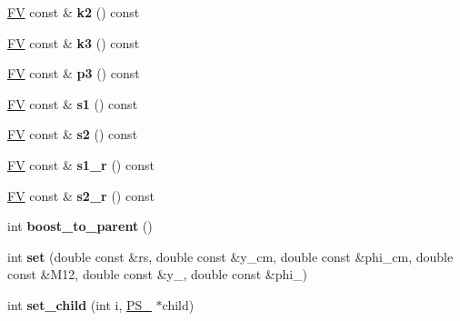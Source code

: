 \begin{DoxyCompactItemize}
\item 
\hypertarget{classPS__2__3_a1135303ac75b75469ceee3de6f1d03de}{\hyperlink{classFV}{F\-V} const \& {\bfseries k2} () const }\label{classPS__2__3_a1135303ac75b75469ceee3de6f1d03de}

\item 
\hypertarget{classPS__2__3_a7fab5e0b464b5bd373cfef36df34c8dd}{\hyperlink{classFV}{F\-V} const \& {\bfseries k3} () const }\label{classPS__2__3_a7fab5e0b464b5bd373cfef36df34c8dd}

\item 
\hypertarget{classPS__2__3_a4264525b624f20abba9726190a9bdaec}{\hyperlink{classFV}{F\-V} const \& {\bfseries p3} () const }\label{classPS__2__3_a4264525b624f20abba9726190a9bdaec}

\item 
\hypertarget{classPS__2__3_a8df409a98b15a028d61fd3066773892b}{\hyperlink{classFV}{F\-V} const \& {\bfseries s1} () const }\label{classPS__2__3_a8df409a98b15a028d61fd3066773892b}

\item 
\hypertarget{classPS__2__3_a447e218eba3647afcf3d24dfef90025f}{\hyperlink{classFV}{F\-V} const \& {\bfseries s2} () const }\label{classPS__2__3_a447e218eba3647afcf3d24dfef90025f}

\item 
\hypertarget{classPS__2__3_a4d40c196598e574109dd37179870363a}{\hyperlink{classFV}{F\-V} const \& {\bfseries s1\-\_\-r} () const }\label{classPS__2__3_a4d40c196598e574109dd37179870363a}

\item 
\hypertarget{classPS__2__3_ab5228f4101a880ebc59802364d347a76}{\hyperlink{classFV}{F\-V} const \& {\bfseries s2\-\_\-r} () const }\label{classPS__2__3_ab5228f4101a880ebc59802364d347a76}

\item 
\hypertarget{classPS__2__3_ad6c103ccf419ec6f416c54866d305fd0}{int {\bfseries boost\-\_\-to\-\_\-parent} ()}\label{classPS__2__3_ad6c103ccf419ec6f416c54866d305fd0}

\item 
\hypertarget{classPS__2__3_a278af8edd62fe80330a5dc5f2d385bf5}{int {\bfseries set} (double const \&rs, double const \&y\-\_\-cm, double const \&phi\-\_\-cm, double const \&M12, double const \&y\-\_, double const \&phi\-\_)}\label{classPS__2__3_a278af8edd62fe80330a5dc5f2d385bf5}

\item 
\hypertarget{classPS__2__3_a2da075a0d45b58fd9b4b50f6185a7368}{int {\bfseries set\-\_\-child} (int i, \hyperlink{classPS__2}{P\-S\-\_} $\ast$child)}\label{classPS__2__3_a2da075a0d45b58fd9b4b50f6185a7368}


\end{DoxyCompactItemize}
